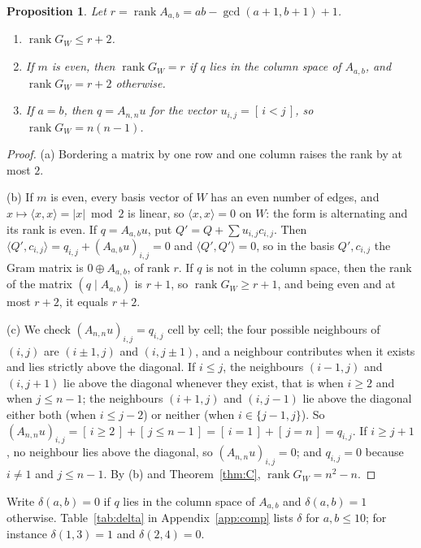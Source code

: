 \documentclass[11pt]{amsart}
\newtheorem{proposition}[theorem]{Proposition}
\theoremstyle{definition}
\theoremstyle{remark}
\numberwithin{equation}{section}
\newcommand{\Iv}[1]{[\,#1\,]}
\DeclareMathOperator{\rank}{rank}
\begin{document}
\begin{proposition}\label{prop:gram}
Let $r=\rank A_{a,b}=ab-\gcd(a+1,b+1)+1$.
\begin{enumerate}[label=\textup{(\alph*)}]
\item $\rank G_W\le r+2$.
\item If $m$ is even, then $\rank G_W=r$ if $q$ lies in the column space of $A_{a,b}$, and $\rank G_W=r+2$ otherwise.
\item If $a=b$, then $q=A_{n,n}u$ for the vector $u_{i,j}=\Iv{i<j}$, so $\rank G_W=n(n-1)$.
\end{enumerate}
\end{proposition}

\begin{proof}
(a) Bordering a matrix by one row and one column raises the rank by at most $2$.

(b) If $m$ is even, every basis vector of $W$ has an even number of edges, and $x\mapsto\langle x,x\rangle=|x|\bmod 2$ is linear, so $\langle x,x\rangle=0$ on $W$: the form is alternating and its rank is even. If $q=A_{a,b}u$, put $Q'=Q+\sum u_{i,j}c_{i,j}$. Then $\langle Q',c_{i,j}\rangle=q_{i,j}+(A_{a,b}u)_{i,j}=0$ and $\langle Q',Q'\rangle=0$, so in the basis $Q',c_{i,j}$ the Gram matrix is $0\oplus A_{a,b}$, of rank $r$. If $q$ is not in the column space, then the rank of the matrix $(q\mid A_{a,b})$ is $r+1$, so $\rank G_W\ge r+1$, and being even and at most $r+2$, it equals $r+2$.

(c) We check $(A_{n,n}u)_{i,j}=q_{i,j}$ cell by cell; the four possible neighbours of $(i,j)$ are $(i\pm1,j)$ and $(i,j\pm1)$, and a neighbour contributes when it exists and lies strictly above the diagonal. If $i\le j$, the neighbours $(i-1,j)$ and $(i,j+1)$ lie above the diagonal whenever they exist, that is when $i\ge2$ and when $j\le n-1$; the neighbours $(i+1,j)$ and $(i,j-1)$ lie above the diagonal either both (when $i\le j-2$) or neither (when $i\in\{j-1,j\}$). So $(A_{n,n}u)_{i,j}=\Iv{i\ge2}+\Iv{j\le n-1}=\Iv{i=1}+\Iv{j=n}=q_{i,j}$. If $i\ge j+1$, no neighbour lies above the diagonal, so $(A_{n,n}u)_{i,j}=0$; and $q_{i,j}=0$ because $i\ne1$ and $j\le n-1$. By (b) and Theorem~\ref{thm:C}, $\rank G_W=n^2-n$.
\end{proof}

Write $\delta(a,b)=0$ if $q$ lies in the column space of $A_{a,b}$ and $\delta(a,b)=1$ otherwise. Table~\ref{tab:delta} in Appendix~\ref{app:comp} lists $\delta$ for $a,b\le10$; for instance $\delta(1,3)=1$ and $\delta(2,4)=0$.
\end{document}
